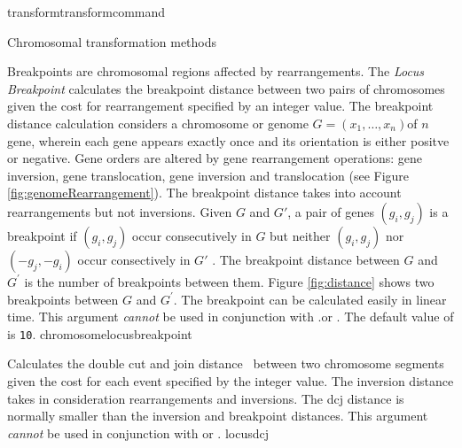 \begin{command}{transform}{transformcommand}
\begin{arguments}
\begin{argumentgroup}{Chromosomal transformation methods}
\begin{description}
                        {Breakpoints are chromosomal regions affected by rearrangements.  The \emph{Locus Breakpoint}
                         calculates the breakpoint distance \cite{blanchetteetal1997}
                        between two pairs of chromosomes given the cost for rearrangement
                        specified by an integer value.  The breakpoint distance calculation considers
                        a chromosome or genome $G = (x_1, \ldots, x_n)$of $n$ gene, wherein each
                        gene appears exactly once and its orientation is either positve or negative.  Gene
                        orders are altered by gene rearrangement operations: gene inversion, gene translocation,
                        gene inversion and translocation (see Figure \ref{fig:genomeRearrangement}).  
                        The breakpoint distance takes into account rearrangements but not inversions.
                        Given $G$ and $G'$, a pair of genes $(g_i, g_j)$ is a breakpoint if $(g_i, g_j)$ occur 
                        consecutively in $G$ but neither $(g_i, g_j)$ nor $(-g_j, -g_i)$ occur
                        consectively in $G'$  \cite{sankoffandblanchette1997}.  The breakpoint distance between $G$
		     and $G^\prime$ is the number of breakpoints between them.  Figure \ref{fig:distance} 
                        shows two breakpoints between $G$ and $G^\prime$. The breakpoint can be calculated 
                        easily in linear time.  This argument \emph{cannot} be used in
                        conjunction with .or
                        . The default
                        value of  is \texttt{10}.} 
                        {chromosomelocusbreakpoint} 
                        
                        {Calculates the double cut and join
                        distance~\cite{Yancopoulosetal2005}
                        between two chromosome segments given the cost for each
                        event specified by the integer value. The inversion distance
                        takes in consideration rearrangements and
                        inversions. The dcj distance is normally smaller than
                        the inversion and breakpoint distances.
                        This argument \emph{cannot} be used in conjunction with
                         or
                        .} 
                        {locusdcj}
                        

\end{description}
\end{argumentgroup}
\end{arguments}
\end{command}
